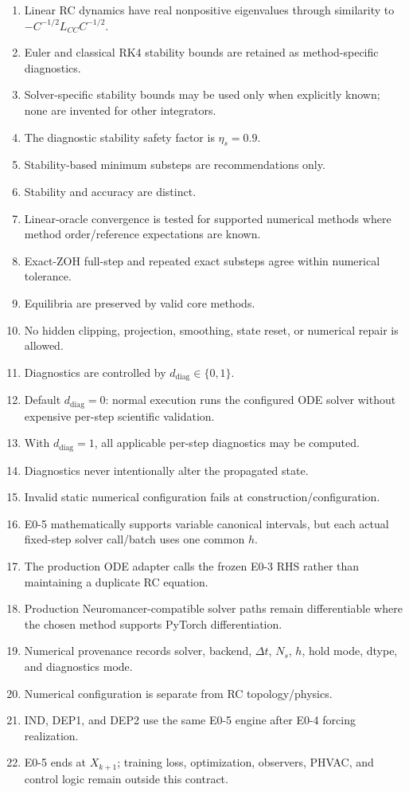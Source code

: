\documentclass[11pt]{article}
\newcommand{\diagmode}{d_{\mathrm{diag}}}
\begin{document}
\begin{enumerate}[leftmargin=*]
\item Linear RC dynamics have real nonpositive eigenvalues through similarity to
$-C^{-1/2}L_{CC}C^{-1/2}$.
\item Euler and classical RK4 stability bounds are retained as method-specific
diagnostics.
\item Solver-specific stability bounds may be used only when explicitly known;
none are invented for other integrators.
\item The diagnostic stability safety factor is $\eta_s=0.9$.
\item Stability-based minimum substeps are recommendations only.
\item Stability and accuracy are distinct.
\item Linear-oracle convergence is tested for supported numerical methods where
method order/reference expectations are known.
\item Exact-ZOH full-step and repeated exact substeps agree within numerical
tolerance.
\item Equilibria are preserved by valid core methods.
\item No hidden clipping, projection, smoothing, state reset, or numerical repair
is allowed.
\item Diagnostics are controlled by $\diagmode\in\{0,1\}$.
\item Default $\diagmode=0$: normal execution runs the configured ODE solver
without expensive per-step scientific validation.
\item With $\diagmode=1$, all applicable per-step diagnostics may be computed.
\item Diagnostics never intentionally alter the propagated state.
\item Invalid static numerical configuration fails at construction/configuration.
\item E0-5 mathematically supports variable canonical intervals, but each actual
fixed-step solver call/batch uses one common $h$.
\item The production ODE adapter calls the frozen E0-3 RHS rather than maintaining
a duplicate RC equation.
\item Production Neuromancer-compatible solver paths remain differentiable where
the chosen method supports PyTorch differentiation.
\item Numerical provenance records solver, backend, $\Delta t$, $N_s$, $h$, hold
mode, dtype, and diagnostics mode.
\item Numerical configuration is separate from RC topology/physics.
\item IND, DEP1, and DEP2 use the same E0-5 engine after E0-4 forcing realization.
\item E0-5 ends at $X_{k+1}$; training loss, optimization, observers, PHVAC, and
control logic remain outside this contract.
\end{enumerate}
\end{document}
